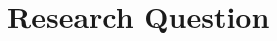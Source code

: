 \documentclass[11pt,a4paper]{article}
\begin{document}



\section{Research Question}
\label{sec:probStatement}




\end{document}
